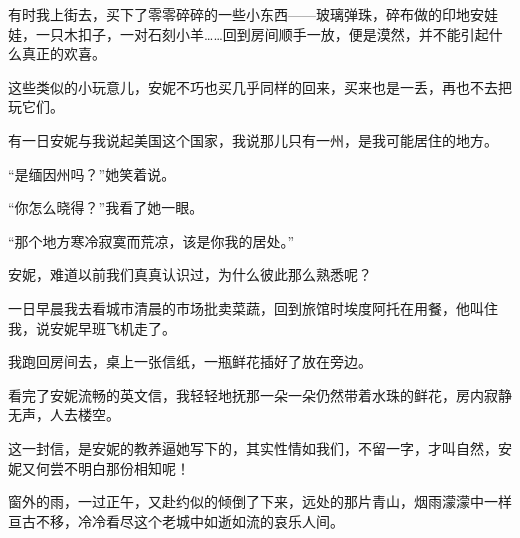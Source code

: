\par 有时我上街去，买下了零零碎碎的一些小东西——玻璃弹珠，碎布做的印地安娃娃，一只木扣子，一对石刻小羊……回到房间顺手一放，便是漠然，并不能引起什么真正的欢喜。
\par 这些类似的小玩意儿，安妮不巧也买几乎同样的回来，买来也是一丢，再也不去把玩它们。
\par 有一日安妮与我说起美国这个国家，我说那儿只有一州，是我可能居住的地方。
\par “是缅因州吗？”她笑着说。
\par “你怎么晓得？”我看了她一眼。
\par “那个地方寒冷寂寞而荒凉，该是你我的居处。”
\par 安妮，难道以前我们真真认识过，为什么彼此那么熟悉呢？
\par 一日早晨我去看城市清晨的市场批卖菜蔬，回到旅馆时埃度阿托在用餐，他叫住我，说安妮早班飞机走了。
\par 我跑回房间去，桌上一张信纸，一瓶鲜花插好了放在旁边。
\par 看完了安妮流畅的英文信，我轻轻地抚那一朵一朵仍然带着水珠的鲜花，房内寂静无声，人去楼空。
\par 这一封信，是安妮的教养逼她写下的，其实性情如我们，不留一字，才叫自然，安妮又何尝不明白那份相知呢！
\par 窗外的雨，一过正午，又赴约似的倾倒了下来，远处的那片青山，烟雨濛濛中一样亘古不移，冷冷看尽这个老城中如逝如流的哀乐人间。



